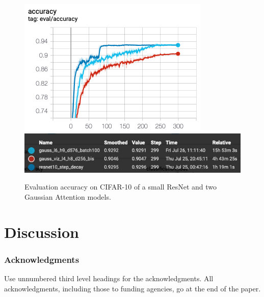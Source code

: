 \documentclass{article} %
\begin{document}
\begin{figure}[h]
  \includegraphics[width=.4\linewidth]{plots/eval_accuracy_plot.png}
  \hfill
  \includegraphics[width=.6\linewidth]{plots/eval_accuracy_legend.png}
  \caption{Evaluation accuracy on CIFAR-10 of a small ResNet and two Gaussian Attention models.}
\end{figure}



\section{Discussion}
\label{sec:discussion}




\subsubsection*{Acknowledgments}
Use unnumbered third level headings for the acknowledgments. All
acknowledgments, including those to funding agencies, go at the end of the paper.





\end{document}
